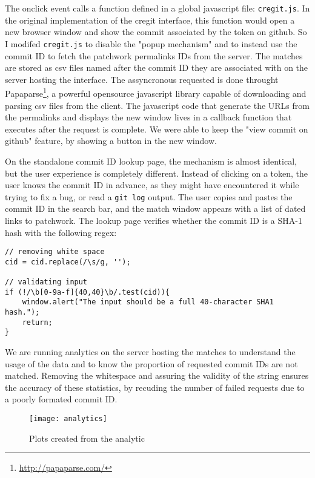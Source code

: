 The onclick event calls a function defined in a global javascript file: \texttt{cregit.js}. In the original implementation of the cregit interface, this function would open a new browser window and show the commit associated by the token on github. So I modifed \texttt{cregit.js} to disable the "popup mechanism" and to instead use the commit ID to fetch the patchwork permalinks IDs from the server. The matches are stored as csv files named after the commit ID they are associated with on the server hosting the interface. The assyncronous requested is done throught Papaparse\footnote{\url{http://papaparse.com/}}, a powerful opensource javascript library capable of downloading and parsing csv files from the client. The javascript code that generate the URLs from the permalinks and displays the new window lives in a callback function that executes after the request is complete. We were able to keep the "view commit on github" feature, by showing a button in the new window.  

On the standalone commit ID lookup page, the mechanism is almost identical, but the user experience is completely different. Instead of clicking on a token, the user knows the commit ID in advance, as they might have encountered it while trying to fix a bug, or read a \texttt{git log} output. The user copies and pastes the commit ID in the search bar, and the match window appears with a list of dated links to patchwork. The lookup page verifies whether the commit ID is a SHA-1 hash with the following regex:

\begin{lstlisting}
// removing white space
cid = cid.replace(/\s/g, '');

// validating input
if (!/\b[0-9a-f]{40,40}\b/.test(cid)){
    window.alert("The input should be a full 40-character SHA1 hash.");
    return;
}
\end{lstlisting}

We are running analytics on the server hosting the matches to understand the usage of the data and to know the proportion of requested commit IDs are not matched. Removing the whitespace and assuring the validity of the string ensures the accuracy of these statistics, by recuding the number of failed requests due to a poorly formated commit ID.

 \begin{figure}[htb]
\centering
\texttt{[image: analytics]}
\caption{Plots created from the analytic}
\label{fig:analytics}
\end{figure}

